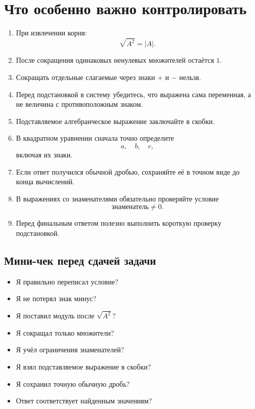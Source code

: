 \documentclass[a4paper,12pt]{article}
\begin{document}
\clearpage

\section{Что особенно важно контролировать}

\begin{enumerate}
  \item
  При извлечении корня:
  \[
  \sqrt{A^2}=|A|.
  \]

  \item
  После сокращения одинаковых ненулевых множителей остаётся \(1\).

  \item
  Сокращать отдельные слагаемые через знаки \(+\) и \(-\) нельзя.

  \item
  Перед подстановкой в систему убедитесь, что выражена сама переменная, а не величина с противоположным знаком.

  \item
  Подставляемое алгебраическое выражение заключайте в скобки.

  \item
  В квадратном уравнении сначала точно определите
  \[
  a,\quad b,\quad c,
  \]
  включая их знаки.

  \item
  Если ответ получился обычной дробью, сохраняйте её в точном виде до конца вычислений.

  \item
  В выражениях со знаменателями обязательно проверяйте условие
  \[
  \text{знаменатель}\ne0.
  \]

  \item
  Перед финальным ответом полезно выполнить короткую проверку подстановкой.
\end{enumerate}

\subsection{Мини-чек перед сдачей задачи}

\begin{itemize}
  \item Я правильно переписал условие?
  \item Я не потерял знак минус?
  \item Я поставил модуль после \(\sqrt{A^2}\)?
  \item Я сокращал только множители?
  \item Я учёл ограничения знаменателей?
  \item Я взял подставляемое выражение в скобки?
  \item Я сохранил точную обычную дробь?
  \item Ответ соответствует найденным значениям?
\end{itemize}
\end{document}
